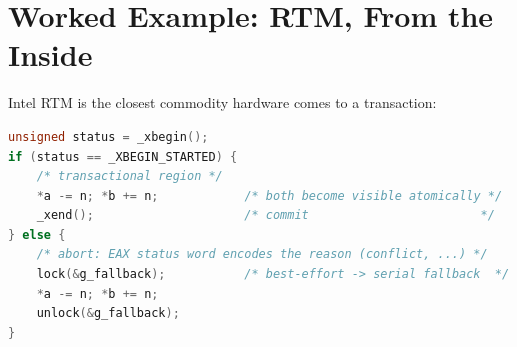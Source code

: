 \section{Worked Example: RTM, From the Inside}
\label{sec:rtm-example}

Intel RTM is the closest commodity hardware comes to a transaction:

\begin{lstlisting}[language=C, caption={The RTM contract: begin, body, fall back on abort.}]
unsigned status = _xbegin();
if (status == _XBEGIN_STARTED) {
    /* transactional region */
    *a -= n; *b += n;            /* both become visible atomically */
    _xend();                     /* commit                        */
} else {
    /* abort: EAX status word encodes the reason (conflict, ...) */
    lock(&g_fallback);           /* best-effort -> serial fallback  */
    *a -= n; *b += n;
    unlock(&g_fallback);
}
\end{lstlisting}


